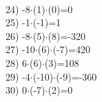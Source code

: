 \documentclass[a4paper,10pt]{article}
\begin{document}
\vspace{0.5cm}\\24)   -8$\cdot$(1)$\cdot$(0)=0
\vspace{0.5cm}\\25)   -1$\cdot$(-1)=1
\vspace{0.5cm}\\26)   -8$\cdot$(5)$\cdot$(8)=-320
\vspace{0.5cm}\\27)   -10$\cdot$(6)$\cdot$(-7)=420
\vspace{0.5cm}\\28)   6$\cdot$(6)$\cdot$(3)=108
\vspace{0.5cm}\\29)   -4$\cdot$(-10)$\cdot$(-9)=-360
\vspace{0.5cm}\\30)   0$\cdot$(-7)$\cdot$(2)=0
\vspace{0.5cm}\\\pagebreak
\end{document}
